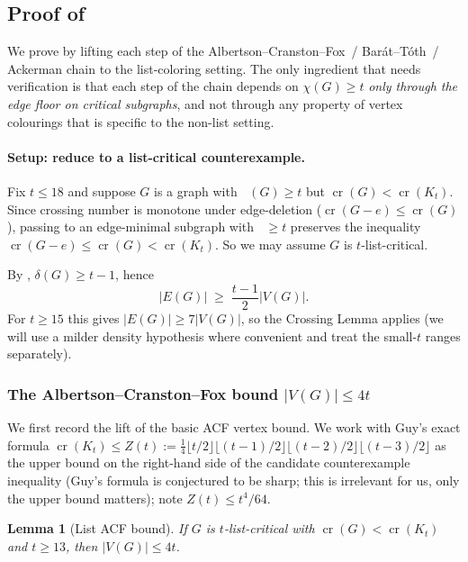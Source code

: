 \documentclass[11pt,a4paper]{article}
\newtheorem{lemma}[theorem]{Lemma}
\theoremstyle{definition}
\DeclareMathOperator{\crN}{cr}
\DeclareMathOperator{\chl}{\chi_{\ell}}
\begin{document}
\subsection{Proof of \texorpdfstring{}{Theorem~\ref*{thm:main-list}}}
\label{ssec:proof-list}

We prove  by lifting each step of the
Albertson--Cranston--Fox~/ Bar\'at--T\'oth~/ Ackerman chain to the
list-coloring setting. The only ingredient that needs verification
is that each step of the chain depends on $\chi(G) \ge t$
\emph{only through the edge floor on critical subgraphs}, and not
through any property of vertex colourings that is specific to the
non-list setting.

\paragraph{Setup: reduce to a list-critical counterexample.}
Fix $t \le 18$ and suppose $G$ is a graph with $\chl(G) \ge t$ but
$\crN(G) < \crN(K_t)$. Since crossing number is monotone under
edge-deletion ($\crN(G - e) \le \crN(G)$), passing to an edge-minimal
subgraph with $\chl \ge t$ preserves the inequality
$\crN(G - e) \le \crN(G) < \crN(K_t)$. So we may assume $G$ is
$t$-list-critical.

By , $\delta(G) \ge t - 1$, hence
\begin{equation}\label{eq:edge-floor}
   |E(G)| \;\ge\; \frac{t - 1}{2} |V(G)|.
\end{equation}
For $t \ge 15$ this gives $|E(G)| \ge 7 |V(G)|$, so the
Crossing Lemma  applies (we will use a milder
density hypothesis where convenient and treat the small-$t$ ranges
separately).

\subsubsection*{The Albertson--Cranston--Fox bound $|V(G)| \le 4t$}

We first record the lift of the basic ACF vertex bound. We work
with Guy's exact formula
$\crN(K_t) \le Z(t) := \tfrac{1}{4} \lfloor t/2 \rfloor
\lfloor (t-1)/2 \rfloor \lfloor (t-2)/2 \rfloor \lfloor (t-3)/2 \rfloor$
as the upper bound on the right-hand side of the candidate
counterexample inequality (Guy's formula is conjectured to be
sharp; this is irrelevant for us, only the upper bound matters);
note $Z(t) \le t^4 / 64$.

\begin{lemma}[List ACF bound]\label{lem:list-acf}
If $G$ is $t$-list-critical with $\crN(G) < \crN(K_t)$ and
$t \ge 13$, then $|V(G)| \le 4t$.
\end{lemma}
\end{document}
